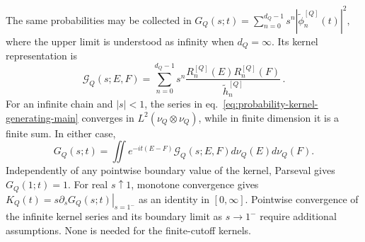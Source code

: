 \documentclass[a4paper,11pt]{article}
\def\dd{d}%
\def\ii{i}%
\def\ee{e}%
\theoremstyle{definition}
\theoremstyle{remark}
\newcommand{\dd}{\mathrm d}
\newcommand{\ii}{\mathrm i}
\newcommand{\ee}{\mathrm e}
\newcommand{\tphi}{\widetilde\phi}
\newcommand{\thh}{\widetilde h}
\begin{document}
The same probabilities may be collected in
$
   G_Q(s;t)=\sum_{n=0}^{d_Q-1}
   s^n|\tphi_n^{[Q]}(t)|^2,
$
where the upper limit is understood as infinity when $d_Q=\infty$. Its kernel representation is 
\begin{equation}
   \mathscr G_Q(s;E,F)
   =
   \sum_{n=0}^{d_Q-1}
   s^n
   \frac{R_n^{[Q]}(E)R_n^{[Q]}(F)}
   {\thh_n^{[Q]}}\,.
   \label{eq:probability-kernel-generating-main}
\end{equation}
For an infinite chain and $|s|<1$, the series in
eq.~\eqref{eq:probability-kernel-generating-main} converges in
$L^2(\nu_Q\otimes\nu_Q)$, while in finite dimension it is a finite sum. In either case,
\begin{equation}
   G_Q(s;t)
   =
   \iint
   \ee^{-\ii t(E-F)}
   \mathscr G_Q(s;E,F)
   \dd\nu_Q(E)\dd\nu_Q(F).
\end{equation}
Independently of any pointwise boundary value of the kernel, Parseval gives $G_Q(1;t)=1$. For real $s\uparrow 1$, monotone convergence gives
$
   K_Q(t)=\left.s\partial_sG_Q(s;t)\right|_{s=1^-}
$
as an identity in $[0,\infty]$. Pointwise convergence of the infinite kernel series and its boundary limit as $s\to1^-$ require additional assumptions. None is needed for the finite-cutoff kernels.
\end{document}
